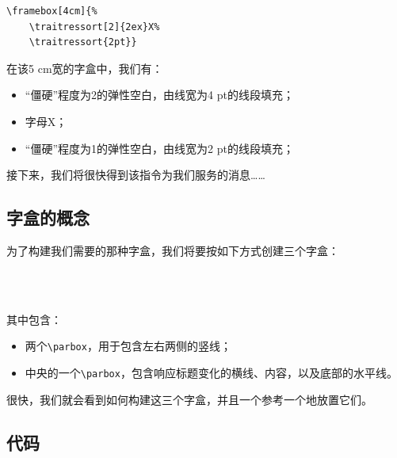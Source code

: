 \begin{codelist}[10.18]{
}\begin{verbatim}
\framebox[4cm]{%
    \traitressort[2]{2ex}X%
    \traitressort{2pt}}
\end{verbatim}
\end{codelist}

在该5 cm宽的字盒中，我们有：

\begin{itemize}
    \item “僵硬”程度为2的弹性空白，由线宽为4 pt的线段填充；
    \item 字母X；
    \item “僵硬”程度为1的弹性空白，由线宽为2 pt的线段填充；
\end{itemize}

接下来，我们将很快得到该指令为我们服务的消息……

\subsection{字盒的概念}

为了构建我们需要的那种字盒，我们将要按如下方式创建三个字盒：

\begin{center}
    \fbox{\parbox{3pt}{%
        \rule{0pt}{1.215cm}%
        \rule{3pt}{1.025cm}}}%
    \parbox[][1.5cm][c]{4cm}{%
        \begin{flushleft}
          \\\nointerlineskip
          \\\nointerlineskip
          \framebox[4cm]{\traitressort{3pt}}
        \end{flushleft}}%
    \fbox{\parbox{3pt}{%
        \rule{0pt}{1.215cm}%
        \rule{3pt}{1.025cm}}}
\end{center}

其中包含：

\begin{itemize}
    \item 两个\verb|\parbox|，用于包含左右两侧的竖线；
    \item 中央的一个\verb|\parbox|，包含响应标题变化的横线、内容，以及底部的水平线。
\end{itemize}

很快，我们就会看到如何构建这三个字盒，并且一个参考一个地放置它们。

\subsection{代码}

